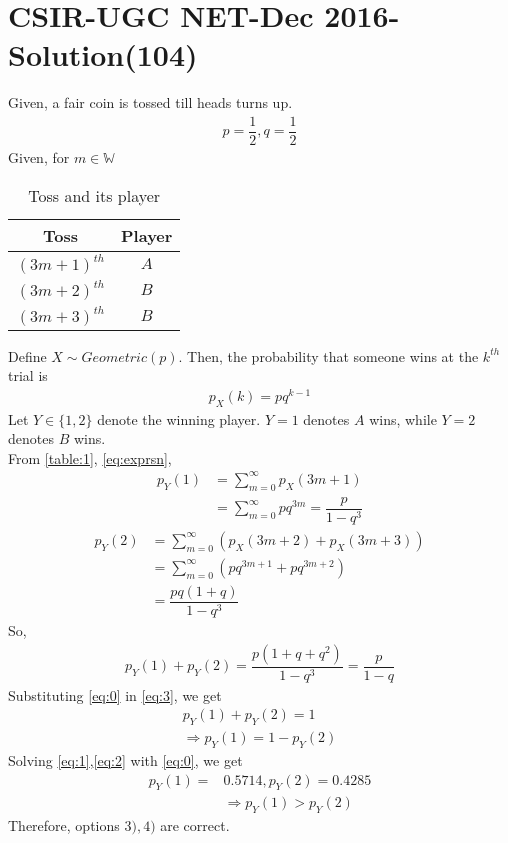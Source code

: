 \documentclass[journal,12pt,twocolumn]{IEEEtran}
\begin{document}
\section*{CSIR-UGC NET-Dec 2016-Solution(104)}
Given, a fair coin is tossed till heads turns up.
\begin{align}
\tag{104.1}
\label{eq:0}
    p=\dfrac{1}{2},q=\dfrac{1}{2}
\end{align}
Given, for $ m \in \mathbb{W}$
\begin{table}[h!]
\centering
\caption{Toss and its player}
\label{table:1}
\begin{tabular}{|c|c|}
    \hline
    Toss & Player \\
    \hline
    $(3m+1)^{th}$ & $A$\\[1ex]
    \hline
    $(3m+2)^{th}$ & $B$\\[1ex]
    \hline
    $(3m+3)^{th}$ & $B$\\[1ex]
    \hline
\end{tabular}
\end{table}
\newline
Define $X\sim Geometric(p)$. Then, the probability that someone wins at the $k^{th}$ trial is
\begin{align}
\tag{104.2}
\label{eq:exprsn}
    p_{X}(k)=pq^{k-1}
\end{align}
Let $Y \in \{ 1,2\}$ denote the winning player. $Y=1$ denotes $A$ wins, while $Y=2$ denotes $B$ wins.\\
From \eqref{table:1}, \eqref{eq:exprsn},
\begin{align}
\tag{104.3}
    p_{Y}(1)&=\displaystyle\sum_{m=0}^{\infty}p_{X}(3m+1)\\
\tag{104.4}
\label{eq:1}
    &=\displaystyle\sum_{m=0}^{\infty}pq^{3m}=\dfrac{p}{1-q^{3}}
\end{align}
\begin{align}
\tag{104.5}
    p_{Y}(2)&=\displaystyle\sum_{m=0}^{\infty}(p_{X}(3m+2)+p_{X}(3m+3))\\ 
\tag{104.6}
    &=\displaystyle\sum_{m=0}^{\infty}(pq^{3m+1}+pq^{3m+2})\\
\tag{104.7}
\label{eq:2}
    &=\dfrac{pq(1+q)}{1-q^{3}}
\end{align}
So,
\begin{align}
\tag{104.8}
\label{eq:3}
    p_{Y}(1)+p_{Y}(2)=\dfrac{p(1+q+q^{2})}{1-q^{3}}=\dfrac{p}{1-q}
\end{align}
Substituting \eqref{eq:0} in \eqref{eq:3}, we get
\begin{align}
\tag{104.9}
     p_{Y}(1)+p_{Y}(2)=1\\
\tag{104.10}
    \Rightarrow p_{Y}(1)=1-p_{Y}(2)
\end{align}
Solving \eqref{eq:1},\eqref{eq:2} with \eqref{eq:0}, we get
\begin{align}
\tag{104.11}
    p_{Y}(1)=&0.5714, p_{Y}(2)=0.4285\\
\tag{104.12}
    &\Rightarrow p_{Y}(1)>p_{Y}(2)
\end{align}
Therefore, options $3),4)$ are correct.
\end{document}
